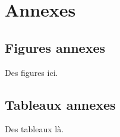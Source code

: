 \chapter{Annexes}



\section{Figures annexes}
Des figures ici.

\section{Tableaux annexes}
Des tableaux là.
